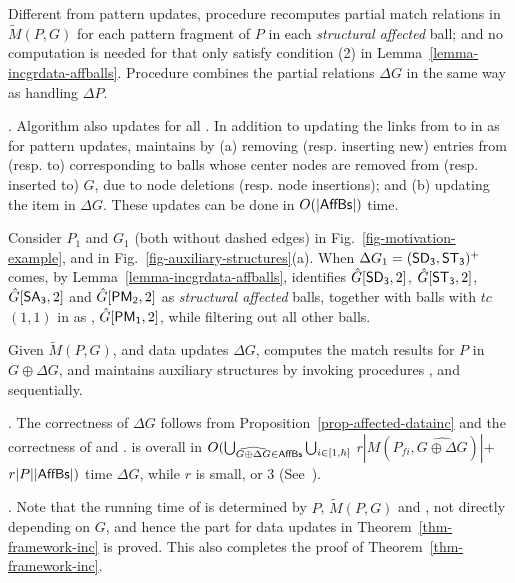 Different from pattern updates, procedure \incmatch recomputes partial match relations in $\tilde{M}(P,G)$
for each pattern fragment of $P$ in each {\em structural affected} ball;
and no computation is needed for \affballsx that only satisfy condition (2) in Lemma~\ref{lemma-incgrdata-affballs}.
Procedure \comb combines the partial relations \wrt $\Delta G$ in the same way as handling $\Delta P$.


. Algorithm \incd also updates \fb for all \affballsx.
In addition to updating the links from \fs to \bs in \fb as for pattern updates,
\incd maintains \bs by
(a) removing (resp. inserting new) entries from (resp. to) \bs corresponding to balls whose center nodes are removed from (resp. inserted to) $G$, due to node deletions (resp. node insertions);
and (b) updating the  item in \bs \wrt $\Delta G$.
These updates can be done in $O(|{\mathsf{AffBs}}|)$ time.


\begin{example}
\label{exa-Ginc}
Consider $P_1$ and $G_1$ (both without dashed edges) in Fig.~\ref{fig-motivation-example}, and \fb in Fig.~\ref{fig-auxiliary-structures}(a).
When $\Delta G_1=({\mathsf{SD_3}},{\mathsf{ST_3}})^+$ comes,
by Lemma~\ref{lemma-incgrdata-affballs},
\identifyaffball identifies $\hat{G}{[{\mathsf{SD_3}}, 2]}$, $\hat{G}{[{\mathsf{ST_3}},2]}$, $\hat{G}{[{\mathsf{SA_3}}, 2]}$ and $\hat{G}{[{\mathsf{PM_2}}, 2]}$ as {\em structural affected} balls,
together with balls with $tc$ $(1, 1)$ in \fb as \affballsx, \ie $\hat{G}{[{\mathsf{PM_1}}, 2]}$, while filtering out all other balls.
\end{example}


 Given $\tilde{M}(P,G)$, \fb and data updates $\Delta G$,
\incd computes the match results for $P$ in $G \oplus \Delta G$, and maintains
auxiliary structures by invoking procedures \identifyaffball, \incmatch and \comb sequentially.


. The correctness of \incd \wrt $\Delta G$ follows from Proposition~\ref{prop-affected-datainc} and the correctness of \incmatch and \comb.
\incd is overall in
$O(\bigcup_{\widehat{G\oplus\Delta G}\in {\ensuremath {\mathsf{AffBs}}}}\bigcup_{i\in[1,h]}$ $r|M(P_{fi}, \widehat{G\oplus\Delta G})|$+$r|P||{\mathsf{AffBs}}|)$ time \wrt $\Delta G$, while $r$ is small,  or 3  (See~\cite{fullvldb18}).


. Note that the running time of \incd is determined by $P$, $\tilde{M}(P,G)$ and \affballsx, not directly depending on $G$,
and hence the part for data updates in Theorem~\ref{thm-framework-inc} is proved. This also completes the proof of Theorem~\ref{thm-framework-inc}.

